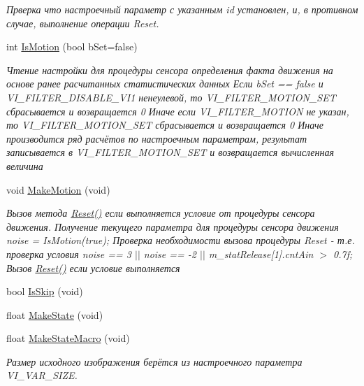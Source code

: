 \begin{DoxyCompactItemize}
\begin{DoxyCompactList}\small\item\em Прверка что настроечный параметр с указанным id установлен, и, в противном случае, выполнение операции Reset. \end{DoxyCompactList}\item 
int \hyperlink{class_c_v_i_engine_base_ab9ac11fcc300832a72d0be60be3419e6}{Is\+Motion} (bool b\+Set=false)
\begin{DoxyCompactList}\small\item\em Чтение настройки для процедуры сенсора определения факта движения на основе ранее расчитанных статистических данных Если b\+Set == false и V\+I\+\_\+\+F\+I\+L\+T\+E\+R\+\_\+\+D\+I\+S\+A\+B\+L\+E\+\_\+\+V\+I1 ненеулевой, то V\+I\+\_\+\+F\+I\+L\+T\+E\+R\+\_\+\+M\+O\+T\+I\+O\+N\+\_\+\+S\+E\+T сбрасывается и возвращается 0 Иначе если V\+I\+\_\+\+F\+I\+L\+T\+E\+R\+\_\+\+M\+O\+T\+I\+O\+N не указан, то V\+I\+\_\+\+F\+I\+L\+T\+E\+R\+\_\+\+M\+O\+T\+I\+O\+N\+\_\+\+S\+E\+T сбрасывается и возвращается 0 Иначе производится ряд расчётов по настроечным параметрам, результат записывается в V\+I\+\_\+\+F\+I\+L\+T\+E\+R\+\_\+\+M\+O\+T\+I\+O\+N\+\_\+\+S\+E\+T и возвращается вычисленная величина \end{DoxyCompactList}\item 
void \hyperlink{class_c_v_i_engine_base_aa31de24bd1b50c4206e8c3a6603985b2}{Make\+Motion} (void)
\begin{DoxyCompactList}\small\item\em Вызов метода \hyperlink{class_c_v_i_engine_base_a27a3545d7253a59150ea9c16e7b4f0ac}{Reset()} если выполняется условие от процедуры сенсора движения. Получение текущего параметра для процедуры сенсора движения noise = Is\+Motion(true); Проверка необходимости вызова процедуры Reset -\/ т.\+е. проверка условия noise == 3 $\vert$$\vert$ noise == -\/2 $\vert$$\vert$ m\+\_\+stat\+Release\mbox{[}1\mbox{]}.cnt\+Ain $>$ 0.\+7f; Вызов \hyperlink{class_c_v_i_engine_base_a27a3545d7253a59150ea9c16e7b4f0ac}{Reset()} если условие выполняется \end{DoxyCompactList}\item 
bool \hyperlink{class_c_v_i_engine_base_a1bedb5c81d496c6c5496ba88cea82eb7}{Is\+Skip} (void)
\item 
float \hyperlink{class_c_v_i_engine_base_aa77b261660041465a8d3e68a7088dd0d}{Make\+State} (void)
\item 
float \hyperlink{class_c_v_i_engine_base_ab42744ae341c3653c24ae3fd38bc7ceb}{Make\+State\+Macro} (void)
\begin{DoxyCompactList}\small\item\em Размер исходного изображения берётся из настроечного параметра V\+I\+\_\+\+V\+A\+R\+\_\+\+S\+I\+Z\+E. \end{DoxyCompactList}\item 

\end{DoxyCompactItemize}
